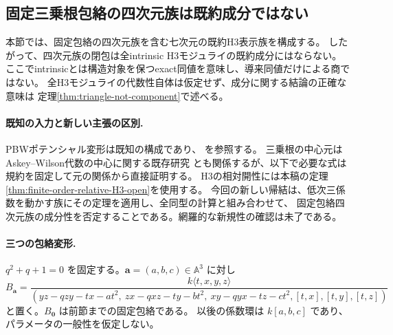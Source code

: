 \subsection{固定三乗根包絡の四次元族は既約成分ではない}
\label{subsec:quantum-triangle-noncomponent}
本節では、固定包絡の四次元族を含む七次元の既約H3表示族を構成する。
したがって、四次元族の閉包は全intrinsic H3モジュライの既約成分にはならない。
ここでintrinsicとは構造対象を保つexact同値を意味し、導来同値だけによる商ではない。
全H3モジュライの代数性自体は仮定せず、成分に関する結論の正確な意味は
定理\ref{thm:triangle-not-component}で述べる。

\paragraph{既知の入力と新しい主張の区別.}
PBWポテンシャル変形は既知の構成であり、
\cite[Proposition 7.3.1(ii)]{EGdelpezzo}を参照する。
三乗根の中心元はAskey--Wilson代数の中心に関する既存研究
\cite{HuangAWCentre}とも関係するが、以下で必要な式は規約を固定して元の関係から直接証明する。
H3の相対開性には本稿の定理\ref{thm:finite-order-relative-H3-open}を使用する。
今回の新しい帰結は、低次三係数を動かす族にその定理を適用し、全同型の計算と組み合わせて、
固定包絡四次元族の成分性を否定することである。網羅的な新規性の確認は未了である。

\paragraph{三つの包絡変形.}
$q^2+q+1=0$ を固定する。$\boldsymbol a=(a,b,c)\in\mathbb A^3$ に対し
\begin{equation}\label{eq:triangle-three-envelope-parameters}
 B_{\boldsymbol a}=
 \frac{k\langle t,x,y,z\rangle}
 {(yz-qzy-tx-at^2,\ zx-qxz-ty-bt^2,\ xy-qyx-tz-ct^2,
 [t,x],[t,y],[t,z])}
\end{equation}
と置く。$B_{\boldsymbol0}$ は前節までの固定包絡である。
以後の係数環は $k[a,b,c]$ であり、パラメータの一般性を仮定しない。

